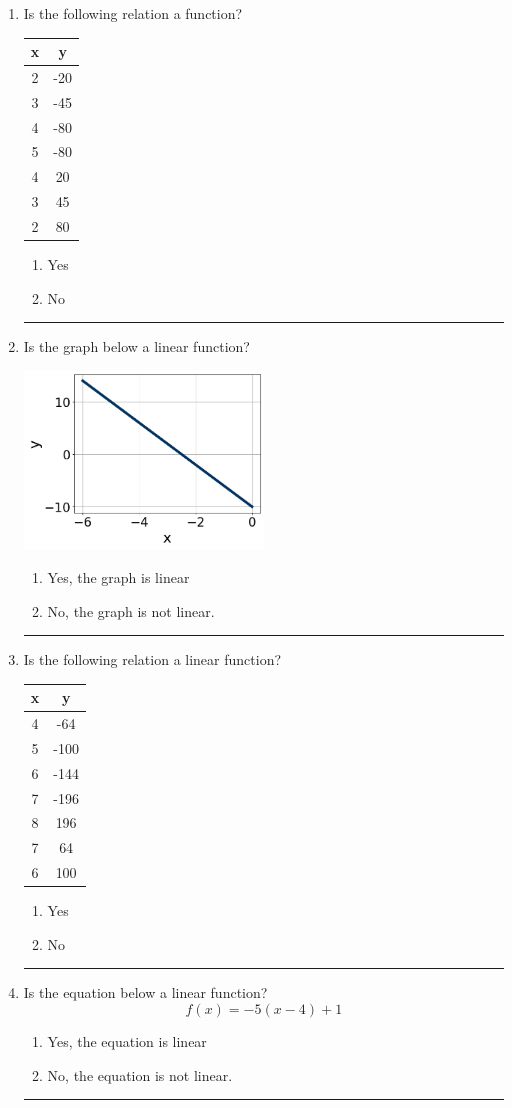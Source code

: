 \documentclass[14pt]{extbook}
\newcommand{\litem}[1]{\item#1\hspace*{-1cm}\rule{\textwidth}{0.4pt}}
\begin{document}
\begin{enumerate}
\litem{
Is the following relation a function?

\begin{tabular}{c|c}
x &y\tabularnewline \hline
2 &-20\tabularnewline \hline
3 &-45\tabularnewline \hline
4 &-80\tabularnewline \hline
5 &-80\tabularnewline \hline
4 &20\tabularnewline \hline
3 &45\tabularnewline \hline
2 &80\end{tabular}\begin{enumerate}[label=\Alph*.]
\item Yes
\item No

\end{enumerate} }
\litem{
Is the graph below a linear function?
\begin{center}
    \includegraphics[width=0.5\textwidth]{../Figures/MA_8_F_1_2_graphA.png}
\end{center}
\begin{enumerate}[label=\Alph*.]
\item Yes, the graph is linear
\item No, the graph is not linear.

\end{enumerate} }
\litem{
Is the following relation a linear function?

\begin{tabular}{c|c}
x &y\tabularnewline \hline
4 &-64\tabularnewline \hline
5 &-100\tabularnewline \hline
6 &-144\tabularnewline \hline
7 &-196\tabularnewline \hline
8 &196\tabularnewline \hline
7 &64\tabularnewline \hline
6 &100\end{tabular}\begin{enumerate}[label=\Alph*.]
\item Yes
\item No

\end{enumerate} }
\litem{
Is the equation below a linear function?\[ f(x) = -5(x -4)+1 \]\begin{enumerate}[label=\Alph*.]
\item Yes, the equation is linear
\item No, the equation is not linear.


\end{enumerate}}
\end{enumerate}
\end{document}
